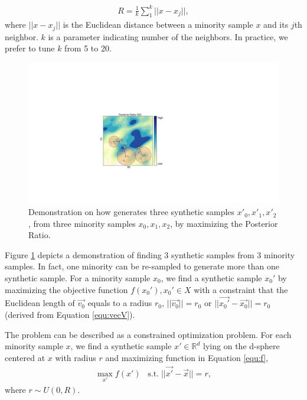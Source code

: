 \begin{align}
	R = \frac{1}{k}\sum\limits_{1}^{k} ||x-x_j ||,
\end{align}
where $||x-x_j||$ is the Euclidean distance between a minority sample $x$ and its $j$th neighbor. $k$ is a parameter indicating number of the neighbors. In practice, we prefer to tune $k$ from 5 to 20.  


\begin{figure}[th!]
	\includegraphics[width=\linewidth, trim=240 140 390 160,clip]{Figures/MaxPosteriorRatio/sphere_maxF.pdf}
	\caption{Demonstration on how \Methodname{} generates three synthetic samples $x'_0, x'_1, x'_2$, from three minority samples $x_0, x_1, x_2$, by maximizing the Posterior Ratio. }
	\label{fig:sphere_maxF}
\end{figure}

Figure \ref{fig:sphere_maxF} depicts a demonstration of finding 3 synthetic samples from 3 minority samples. In fact, one minority can be re-sampled to generate more than one synthetic sample. For a minority sample $x_0$, we find a synthetic sample $x_0'$ by maximizing the objective function $f(x_0'), x_0' \in X$ with a constraint that the Euclidean length of $\vec{v_0}$ equals to a radius $r_0$, $||\vec{v_0}|| = r_0$ or $||\vec{x_0'}-\vec{x_0}||=r_0$ (derived from Equation \ref{equ:vecV}). 


The problem can be described as a constrained optimization problem. For each minority sample $x$, we find a synthetic sample $x'\in \mathbb{R}^d$ lying on the d-sphere centered at $x$ with radius $r$ and maximizing function in Equation \ref{equ:f},
\begin{align}
	\label{prob:optimazation}
	\max_{x'} {f(x')} \;\;\; \textrm{s.t.}\; ||\vec{x'} - \vec{x}||=r,
\end{align}
where $r \sim U(0,R)$.

